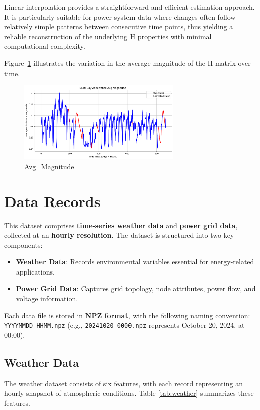 \documentclass[12pt]{article}
\begin{document}
Linear interpolation provides a straightforward and efficient estimation approach. It is particularly suitable for power system data where changes often follow relatively simple patterns between consecutive time points, thus yielding a reliable reconstruction of the underlying H properties with minimal computational complexity.

Figure~\ref{fig:Avg_Magnitude} illustrates the variation in the average magnitude of the H matrix over time. 

\begin{figure}[H]
    \centering
    \includegraphics[width=0.7\textwidth]{picture/Avg_Magnitude.png}
    \caption{Avg\_Magnitude}
\label{fig:Avg_Magnitude}
\end{figure}

\section*{Data Records}

This dataset comprises \textbf{time-series weather data} and \textbf{power grid data}, collected at an \textbf{hourly resolution}. The dataset is structured into two key components:
\begin{itemize}
    \item \textbf{Weather Data}: Records environmental variables essential for energy-related applications.
    \item \textbf{Power Grid Data}: Captures grid topology, node attributes, power flow, and voltage information.
\end{itemize}
Each data file is stored in \textbf{NPZ format}, with the following naming convention: \texttt{YYYYMMDD\_HHMM.npz} (e.g., \texttt{20241020\_0000.npz} represents October 20, 2024, at 00:00).

\subsection*{Weather Data}
The weather dataset consists of six features, with each record representing an hourly snapshot of atmospheric conditions. Table \ref{tab:weather} summarizes these features.
\end{document}
